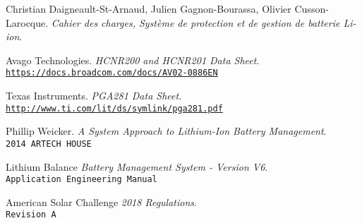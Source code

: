 \documentclass[12pt,letterpaper]{article}
\begin{document}
	\begin{thebibliography}{10}
	
	Christian Daigneault-St-Arnaud, Julien Gagnon-Bourassa, Olivier Cusson-Larocque. \textit{Cahier des charges, Système de protection et de gestion de batterie Li-ion}. \par	
	
	Avago Technologies. \textit{HCNR200 and HCNR201 Data Sheet}.\\ \texttt{\url{https://docs.broadcom.com/docs/AV02-0886EN}}\par
	
	Texas Instruments. \textit{PGA281 Data Sheet}.\\ \texttt{\url{http://www.ti.com/lit/ds/symlink/pga281.pdf}}\par

	Phillip Weicker. \textit{A System Approach to Lithium-Ion Battery Management}.\\ \texttt{2014 ARTECH HOUSE}\par	
	
	Lithium Balance \textit{Battery Management System - Version V6}.\\ \texttt{Application Engineering Manual}\par	

	American Solar Challenge \textit{2018 Regulations}.\\ \texttt{Revision A}\par	
	

	
	\end{thebibliography}	
	
\end{document}
